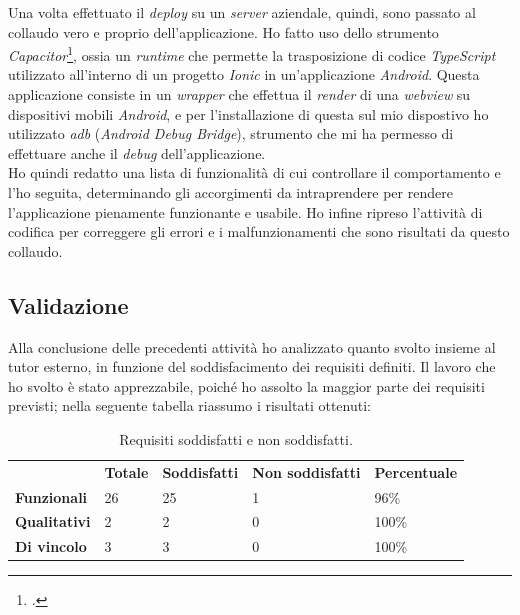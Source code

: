 Una volta effettuato il \textit{deploy} su un \textit{server} aziendale, quindi, sono passato al collaudo vero e proprio dell'applicazione. Ho fatto uso dello strumento \textit{Capacitor}\footcite{tec:capacitor}, ossia un \textit{runtime} che permette la trasposizione di codice \textit{TypeScript} utilizzato all'interno di un progetto \textit{Ionic} in un'applicazione \textit{Android}. Questa applicazione consiste in un \textit{wrapper} che effettua il \textit{render} di una \textit{webview} su dispositivi mobili \textit{Android}, e per l'installazione di questa sul mio dispostivo ho utilizzato \textit{adb} (\textit{Android Debug Bridge}), strumento che mi ha permesso di effettuare anche il \textit{debug} dell'applicazione. \\
Ho quindi redatto una lista di funzionalità di cui controllare il comportamento e l'ho seguita, determinando gli accorgimenti da intraprendere per rendere l'applicazione pienamente funzionante e usabile. Ho infine ripreso l'attività di codifica per correggere gli errori e i malfunzionamenti che sono risultati da questo collaudo.

\subsection*{Validazione}

Alla conclusione delle precedenti attività ho analizzato quanto svolto insieme al tutor esterno, in funzione del soddisfacimento dei requisiti definiti. Il lavoro che ho svolto è stato apprezzabile, poiché ho assolto la maggior parte dei requisiti previsti; nella seguente tabella riassumo i risultati ottenuti:

\begin{table}[h]
  \label{tab:totale-requisiti-soddifatti}
  \begin{center}
    \begin{tabularx}{\textwidth}{lllll}
& \textbf{Totale}         & \textbf{Soddisfatti}    & \textbf{Non soddisfatti} & \textbf{Percentuale}       \\ \cline{2-5}
\multicolumn{1}{l|}{\textbf{Funzionali}}  & \multicolumn{1}{l|}{26} & \multicolumn{1}{l|}{25} & \multicolumn{1}{l|}{1}   & \multicolumn{1}{l|}{96\%}  \\ \cline{2-5}
\multicolumn{1}{l|}{\textbf{Qualitativi}} & \multicolumn{1}{l|}{2}  & \multicolumn{1}{l|}{2}  & \multicolumn{1}{l|}{0}   & \multicolumn{1}{l|}{100\%} \\ \cline{2-5}
\multicolumn{1}{l|}{\textbf{Di vincolo}}  & \multicolumn{1}{l|}{3}  & \multicolumn{1}{l|}{3}  & \multicolumn{1}{l|}{0}   & \multicolumn{1}{l|}{100\%} \\ \cline{2-5}
\end{tabularx}
\end{center}
\caption{Requisiti soddisfatti e non soddisfatti.}
\end{table}

